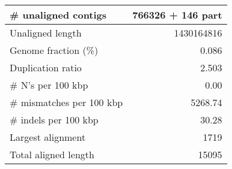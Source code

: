 \documentclass[12pt,a4paper]{article}
\begin{document}
\begin{table}[ht]
\begin{center}
\begin{tabular}{|l*{1}{|r}|}
\# unaligned contigs & 766326 + 146 part \\ \hline
Unaligned length & 1430164816 \\ \hline
Genome fraction (\%) & 0.086 \\ \hline
Duplication ratio & 2.503 \\ \hline
\# N's per 100 kbp & 0.00 \\ \hline
\# mismatches per 100 kbp & 5268.74 \\ \hline
\# indels per 100 kbp & 30.28 \\ \hline
Largest alignment & 1719 \\ \hline
Total aligned length & 15095 \\ \hline
\end{tabular}
\end{center}
\end{table}
\end{document}
